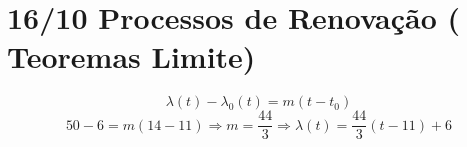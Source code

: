 \documentclass[a4paper,12pt]{article}
\begin{document}
                                        \newpage
                                        \section*{16/10 Processos de Renovação ( Teoremas Limite)}
                                        $$\lambda(t)-\lambda_0(t)=m(t-t_0)$$
                                        $$50-6=m(14-11)\Rightarrow m=\frac{44}{3}\Rightarrow \lambda(t)=\frac{44}{3}(t-11)+6 $$
                                        
   
\end{document}
